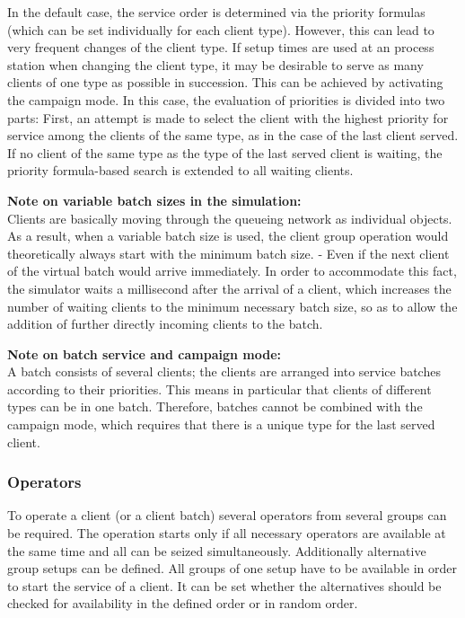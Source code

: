 In the default case, the service order is determined via the priority formulas (which can be set individually for each client type).
However, this can lead to very frequent changes of the client type. If setup times are used at an process station when changing the
client type, it may be desirable to serve as many clients of one type as possible in succession. This can be achieved by activating
the campaign mode. In this case, the evaluation of priorities is divided into two parts: First, an attempt is made to select the
client with the highest priority for service among the clients of the same type, as in the case of the last client served.
If no client of the same type as the type of the last served client is waiting, the priority formula-based search is extended
to all waiting clients.

\textbf{Note on variable batch sizes in the simulation:}~\\
Clients are basically moving through the queueing network as individual objects.
As a result, when a variable batch size is used, the client group operation would theoretically always
start with the minimum batch size. - Even if the next client of the virtual batch would arrive immediately.
In order to accommodate this fact, the simulator waits a millisecond after the arrival of a client, which
increases the number of waiting clients to the minimum necessary batch size, so as to allow the addition
of further directly incoming clients to the batch.

\textbf{Note on batch service and campaign mode:}~\\
A batch consists of several clients; the clients are arranged into service batches according to their priorities.
This means in particular that clients of different types can be in one batch. Therefore, batches cannot
be combined with the campaign mode, which requires that there is a unique type for the last served client.

\subsubsection*{Operators}

To operate a client (or a client batch) several operators from several groups can be required.
The operation starts only if all necessary operators are available at the same time and all can be seized
simultaneously.
Additionally alternative group setups can be defined. All groups of one setup have to be available in order
to start the service of a client. 
It can be set whether the alternatives should be checked for availability in the defined order or in random order.

